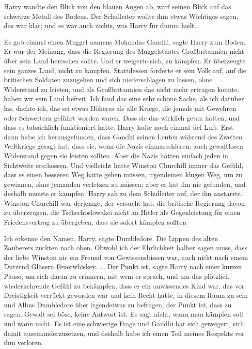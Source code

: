 Harry wandte den Blick von den blauen Augen ab, warf seinen Blick auf das
schwarze Metall des Bodens. Der Schulleiter wollte ihm etwas Wichtiges sagen,
das war klar; und es war auch nichts, was Harry für dumm hielt.

\glqq Es gab einmal einen Muggel namens Mohandas Gandhi\grqq{}, sagte Harry zum
Boden. \glqq Er war der Meinung, dass die Regierung des Muggelstaates
Großbritannien nicht über sein Land herrschen sollte. Und er weigerte sich, zu
kämpfen. Er überzeugte sein ganzes Land, nicht zu kämpfen. Stattdessen forderte
er sein Volk auf, auf die britischen Soldaten zuzugehen und sich niederschlagen
zu lassen, ohne Widerstand zu leisten, und als Großbritannien das nicht mehr
ertragen konnte, haben wir sein Land befreit. Ich fand das eine sehr schöne
Sache, als ich darüber las, dachte ich, das sei etwas Höheres als alle Kriege,
die jemals mit Gewehren oder Schwertern geführt worden waren. Dass sie das
wirklich getan hatten, und dass es tatsächlich funktioniert hatte.\grqq{} Harry
holte noch einmal tief Luft. \glqq Erst dann habe ich herausgefunden, dass
Gandhi seinen Leuten während des Zweiten Weltkriegs gesagt hat, dass sie, wenn
die Nazis einmarschieren, auch gewaltlosen Widerstand gegen sie leisten sollten.
Aber die Nazis hätten einfach jeden in Sichtweite erschossen. Und vielleicht
hatte Winston Churchill immer das Gefühl, dass es einen besseren Weg hätte geben
müssen, irgendeinen klugen Weg, um zu gewinnen, ohne jemanden verletzen zu
müssen; aber er hat ihn nie gefunden, und deshalb musste er kämpfen.\grqq{}
Harry sah zu dem Schulleiter auf, der ihn anstarrte. \glqq Winston Churchill war
derjenige, der versucht hat, die britische Regierung davon zu überzeugen, die
Tschechoslowakei nicht an Hitler als Gegenleistung für einen Friedensvertrag zu
übergeben, dass sie sofort kämpfen sollten -\grqq{}

\glqq Ich erkenne den Namen, Harry\grqq{}, sagte Dumbledore. Die Lippen des
alten Zauberers zuckten nach oben. \glqq Obwohl ich der Ehrlichkeit halber sagen
muss, dass der liebe Winston nie ein Freund von Gewissensbissen war, auch nicht
nach einem Dutzend Gläsern Feuerwhiskey.\grqq{} ... \glqq Der Punkt ist\grqq{},
sagte Harry nach einer kurzen Pause, um sich daran zu erinnern, mit wem er
sprach, und um das plötzlich wiederkehrende Gefühl zu bekämpfen, dass er ein
unwissendes Kind war, das vor Dreistigkeit verrückt geworden war und kein Recht
hatte, in diesem Raum zu sein und Albus Dumbledore über irgendetwas zu befragen,
\glqq der Punkt ist, dass zu sagen, Gewalt sei böse, keine Antwort ist. Es sagt
nicht, wann man kämpfen soll und wann nicht. Es ist eine schwierige Frage und
Gandhi hat sich geweigert, sich damit auseinanderzusetzen, und deshalb habe ich
einen Teil meines Respekts vor ihm verloren.\grqq{}

